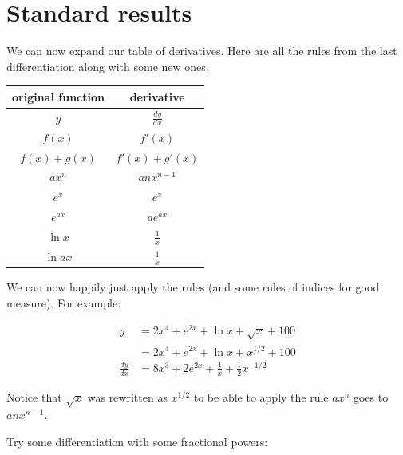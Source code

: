 \documentclass[
  a4paper,
]{scrbook}
\begin{document}
\hypertarget{standard-results}{%
\section{Standard results}\label{standard-results}}

We can now expand our table of derivatives. Here are all the rules from
the last differentiation along with some new ones.

\begin{longtable}[]{@{}cc@{}}
\toprule()
original function & derivative \\
\midrule()
\endhead
\(y\) & \(\frac{dy}{dx}\) \\
\(f(x)\) & \(f'(x)\) \\
\(f(x) + g(x)\) & \(f'(x) + g'(x)\) \\
\(ax^n\) & \(anx^{n-1}\) \\
\(e^x\) & \(e^x\) \\
\(e^{ax}\) & \(ae^{ax}\) \\
\(\ln{x}\) & \(\frac{1}{x}\) \\
\(\ln{ax}\) & \(\frac{1}{x}\) \\
\bottomrule()
\end{longtable}

We can now happily just apply the rules (and some rules of indices for
good measure). For example:

\[
\begin{aligned}
y &= 2x^4 + e^{2x} + \ln{x} + \sqrt{x} + 100 \\
&= 2x^4 + e^{2x} + \ln{x} + x^{1/2} + 100 \\
\frac{dy}{dx} &= 8x^3 + 2e^{2x} + \frac{1}{x} + \frac{1}{2}x^{-1/2} 
\end{aligned}
\]

Notice that \(\sqrt{x}\) was rewritten as \(x^{1/2}\) to be able to
apply the rule \(ax^n\) goes to \(anx^{n-1}\).

Try some differentiation with some fractional powers:
\end{document}
